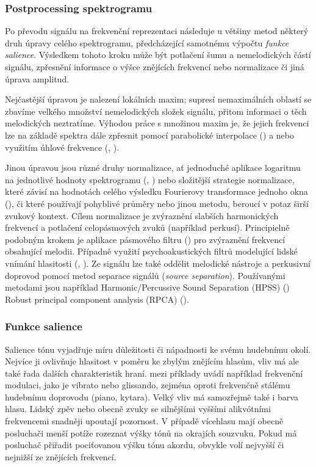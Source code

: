 \subsubsection{Postprocessing spektrogramu}

Po převodu signálu na frekvenční reprezentaci následuje u většiny metod některý druh úpravy celého spektrogramu, předcházející samotnému výpočtu \emph{funkce salience}. Výsledkem tohoto kroku může být potlačení šumu a nemelodických částí signálu, zpřesnění informace o výšce znějících frekvencí nebo normalizace či jiná úprava amplitud.

Nejčastější úpravou je nalezení lokálních maxim; supresí nemaximálních oblastí se zbavíme velkého množství nemelodických složek signálu, přitom informaci o těch melodických neztratíme. Výhodou práce s množinou maxim je, že jejich frekvenci lze na základě spektra dále zpřesnit pomocí parabolické interpolace (\cite{Rao2010}) a nebo využitím úhlové frekvence (\cite{Salamon2012a}, \cite{Dressler2009}). 

Jinou úpravou jsou různé druhy normalizace, ať jednoduché aplikace logaritmu na jednotlivé hodnoty spektrogramu (\cite{Cancela2008}, \cite{Bittner2017}) nebo složitější strategie normalizace, které závisí na hodnotách celého výsledku Fourierovy transformace jednoho okna (\cite{Ryynanen2008}), či které používají pohyblivé průměry nebo jinou metodu, beroucí v potaz širší zvukový kontext. Cílem normalizace je zvýraznění slabších harmonických frekvencí a potlačení celopásmových zvuků (například perkusí). Principielně podobným krokem je aplikace pásmového filtru (\cite{Goto1999}) pro zvýraznění frekvencí obsahující melodii. Případně využití psychoakustických filtrů modelující lidské vnímání hlasitosti (\cite{Salamon2012a}, \cite{Ikemiya2016}). Ze signálu lze také oddělit melodické nástroje a perkusivní doprovod pomocí metod separace signálů (\emph{source separation}). Používanými metodami jsou například Harmonic/Percussive Sound Separation (HPSS) (\cite{Tachibana2010}) Robust principal component analysis (RPCA) (\cite{Ikemiya2016}).

\subsubsection{Funkce salience}

Salience tónu vyjadřuje míru důležitosti či nápadnosti ke svému hudebnímu okolí. Nejvíce ji ovlivňuje hlasitost v poměru ke zbylým znějícím hlasům, vliv má ale také řada dalších charakteristik hraní. \cite{Dressler2016} mezi příklady uvádí například frekvenční modulaci, jako je vibrato nebo glissando, zejména oproti frekvenčně stálému hudebnímu doprovodu (piano, kytara). Velký vliv má samozřejmě také i barva hlasu. Lidský zpěv nebo obecně zvuky se silnějšími vyššími alikvótními frekvencemi snadněji upoutají pozornost. V případě vícehlasu mají obecně posluchači menší potíže rozeznat výšky tónů na okrajích souzvuku. Pokud má posluchač přiřadit pociťovanou výšku tónu akordu, obvykle volí nejvyšší či nejnižší ze znějících frekvencí.


